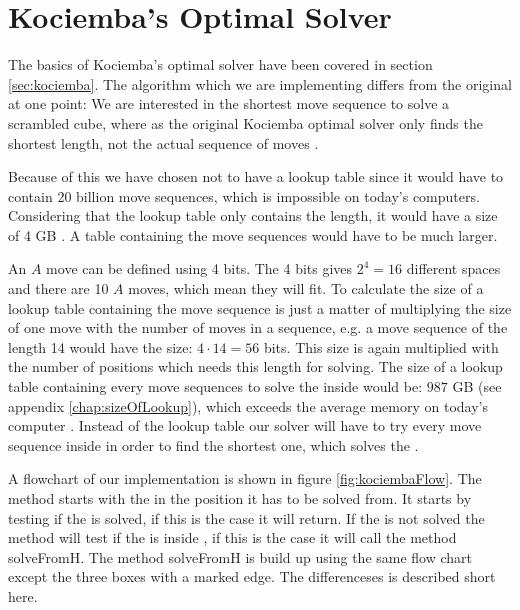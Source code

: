 \chapter{Kociemba's Optimal Solver}
\label{chap:kociembaImplement}
The basics of Kociemba's optimal solver have been covered in section \ref{sec:kociemba}. The algorithm which we are implementing differs from the original at one point:
We are interested in the shortest move sequence to solve a scrambled cube, where as the original Kociemba optimal solver only finds the shortest length, not the actual sequence of moves \cite{rokicki09}.

Because of this we have chosen not to have a lookup table since it would have to contain 20 billion move sequences, which is impossible on today's computers. Considering that the lookup table only contains the length, it would have a size of 4 GB \cite{cubeExplorer}. A table containing the move sequences would have to be much larger.

An $A$ move can be defined using 4 bits.
The 4 bits gives $2^4=16$ different spaces and there are 10 $A$ moves, which mean they will fit.
To calculate the size of a lookup table containing the move sequence is just a matter of multiplying the size of one move with the number of moves in a sequence, e.g. a move sequence of the length 14 would have the size: $4 \cdot 14 = 56$ bits.
This size is again multiplied with the number of positions which needs this length for solving.
The size of a lookup table containing every move sequences to solve the \rubik{} inside  would be: $987$ GB (see appendix \ref{chap:sizeOfLookup}), which exceeds the average memory on today's computer \cite{averageRAM} \cite{maxRAM2}.
Instead of the lookup table our solver will have to try every move sequence inside  in order to find the shortest one, which solves the \rubik{}.

A flowchart of our implementation is shown in figure \ref{fig:kociembaFlow}.
The method starts with the \rubik{} in the position it has to be solved from.
It starts by testing if the \rubik{} is solved, if this is the case it will return.
If the \rubik{} is not solved the method will test if the \rubik{} is inside , if this is the case it will call the method solveFromH.
The method solveFromH is build up using the same flow chart except the three boxes with a marked edge.
The differenceses is described short here.

